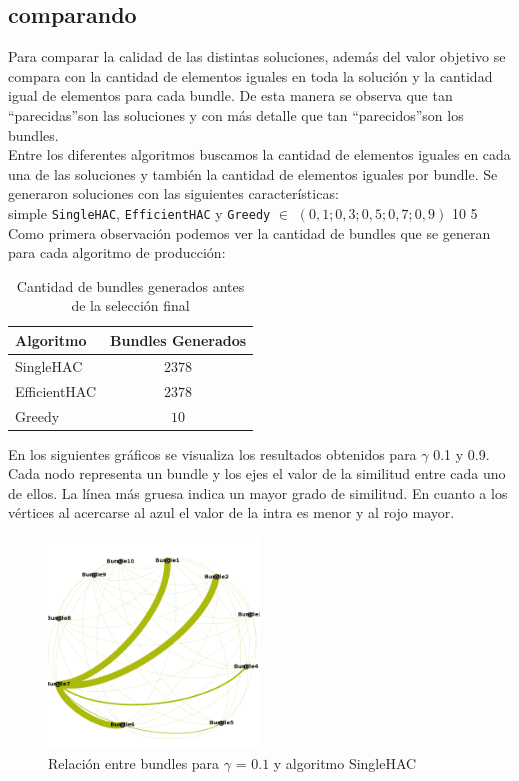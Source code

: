 \subsection{comparando}
Para comparar la calidad de las distintas soluciones, además del valor objetivo se compara con la cantidad de elementos iguales en toda la solución y la cantidad igual de elementos para cada bundle. De esta manera se observa que tan \textquotedblleft parecidas\textquotedblright son las soluciones y con más detalle que tan \textquotedblleft parecidos\textquotedblright son los bundles.\\ 
Entre los diferentes algoritmos buscamos la cantidad de elementos iguales en cada una de las soluciones y también la cantidad de elementos iguales por bundle. Se generaron soluciones con las siguientes características:\\
\Solucion
{}
{simple}
{\texttt{SingleHAC}, \texttt{EfficientHAC} y \texttt{Greedy}}
{$\in$ $(0,1; 0,3; 0,5; 0,7; 0,9)$}
{10}
{5}
Como primera observación podemos ver la cantidad de bundles que se generan para cada algoritmo de 
producción:\\
\begin{table}[h]
  \centering
  \resizebox{0.5\textwidth}{!} {
    \begin{tabular}{|lc|}
    \hline
    Algoritmo & Bundles Generados \\
    \hline
    SingleHAC & $2378$ \\
    EfficientHAC & $2378$ \\
    Greedy & $10$ \\
    \hline
    \end{tabular}
  }
    \caption {Cantidad de bundles generados antes de la selección final}
\end{table}

En los siguientes gráficos se visualiza los resultados obtenidos para $\gamma$ 0.1 y 0.9. Cada 
nodo representa un bundle y los ejes el valor de la similitud entre cada uno de ellos. La línea más 
gruesa indica un mayor grado de similitud. En cuanto a los vértices al acercarse al azul el valor 
de la intra es menor y al rojo mayor.

\begin{figure}[H]
  \centering
    \includegraphics[width=0.5\textwidth]{resultados/papers/intra_inter/hac01.png}
  \caption{Relación entre bundles para $\gamma$ = $0.1$ y algoritmo SingleHAC}
  \label{res:img-papers-gamma01-hac}
\end{figure}

